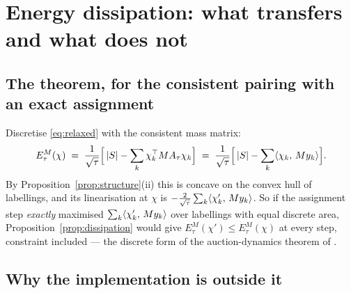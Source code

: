 \documentclass[11pt,a4paper]{article}
\begin{document}
\section{Energy dissipation: what transfers and what does not}
\label{sec:monotonicity}

\subsection{The theorem, for the consistent pairing with an exact assignment}
\label{sec:theorem}

Discretise \eqref{eq:relaxed} with the consistent mass matrix:
\begin{equation}
  E^{M}_\tau(\chi) \;=\; \frac{1}{\sqrt\tau}\Bigl[\, |S| - \sum_k \chi_k^\top M A_\tau \chi_k \Bigr]
  \;=\; \frac{1}{\sqrt\tau}\Bigl[\, |S| - \sum_k \langle \chi_k,\, M y_k \rangle \Bigr].
  \label{eq:E-consistent}
\end{equation}
By Proposition~\ref{prop:structure}(ii) this is concave on the convex hull of
labellings, and its linearisation at $\chi$ is
$-\tfrac{2}{\sqrt\tau} \sum_k \langle \chi'_k,\, M y_k \rangle$. So if the assignment step
\emph{exactly} maximised $\sum_k \langle \chi'_k,\, M y_k \rangle$ over labellings with equal
discrete area, Proposition~\ref{prop:dissipation} would give
$E^M_\tau(\chi') \le E^M_\tau(\chi)$ at every step, constraint included --- the
discrete form of the auction-dynamics theorem of \cite{jacobs2018auction}.

\subsection{Why the implementation is outside it}
\label{sec:outside}
\end{document}
